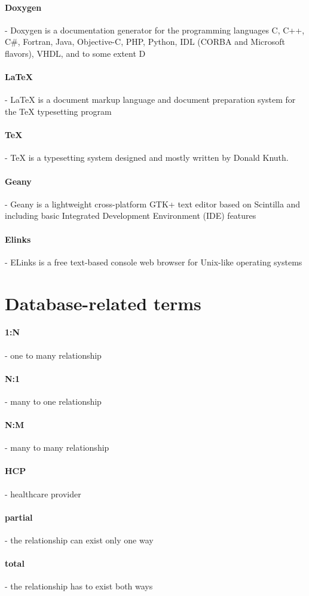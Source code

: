 \paragraph{Doxygen} - Doxygen is a documentation generator for the programming languages C, C++, C\#, Fortran, Java, Objective-C, PHP, Python, IDL (CORBA and Microsoft flavors), VHDL, and to some extent D
\paragraph{\LaTeX} - LaTeX is a document markup language and document preparation system for the TeX typesetting program
\paragraph{\TeX} -  TeX is a typesetting system designed and mostly written by Donald Knuth.
\paragraph{Geany} - Geany is a lightweight cross-platform GTK+ text editor based on Scintilla and including basic Integrated Development Environment (IDE) features
\paragraph{Elinks} - ELinks is a free text-based console web browser for Unix-like operating systems

\section{Database-related terms}
\paragraph{1:N}- one to many relationship
\paragraph{N:1}- many to one relationship
\paragraph{N:M}- many to many relationship
\paragraph{HCP}- healthcare provider
\paragraph{partial}- the relationship can exist only one way
\paragraph{total}- the relationship has to exist both ways